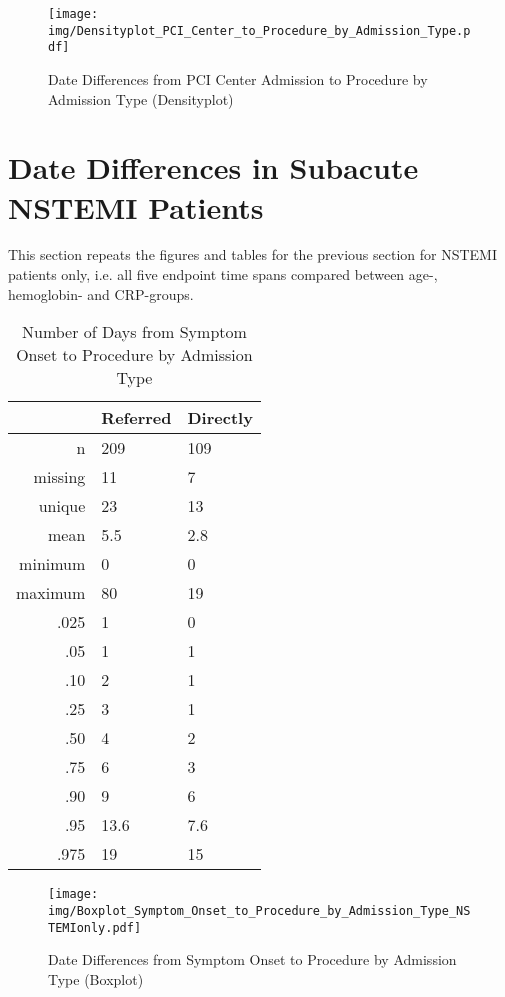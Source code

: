 \documentclass[presentation,xcolor=pdftex,dvipsnames,table,11pt]{beamer}
\begin{document}
\begin{tiny}
\begin{frame}
\begin{figure}
  \centering
  \caption{Date Differences from PCI Center Admission to Procedure by Admission Type (Densityplot)}
  \label{Density: Date Differences from PCI Center Admission to Procedure by Admission Type}
\texttt{[image: img/Densityplot\_PCI\_Center\_to\_Procedure\_by\_Admission\_Type.pdf]}\end{figure}
\end{frame}







\section{Date Differences in Subacute NSTEMI Patients}

This section repeats the figures and tables for the previous section for NSTEMI patients only, i.e. all five endpoint time spans compared between age-, hemoglobin- and CRP-groups.

\begin{table}[ht]
\centering
\begin{tabular}{rll}
  \toprule
 & Referred & Directly \\ 
  \midrule
n & 209 & 109 \\ 
  missing & 11 & 7 \\ 
  unique & 23 & 13 \\ 
  mean & 5.5 & 2.8 \\ 
  minimum & 0 & 0 \\ 
  maximum & 80 & 19 \\ 
  .025 & 1 & 0 \\ 
  .05 & 1 & 1 \\ 
  .10 & 2 & 1 \\ 
  .25 & 3 & 1 \\ 
  .50 & 4 & 2 \\ 
  .75 & 6 & 3 \\ 
  .90 & 9 & 6 \\ 
  .95 & 13.6 & 7.6 \\ 
  .975 & 19 & 15 \\ 
   \bottomrule
\end{tabular}
\caption{Number of Days from Symptom Onset to Procedure by Admission Type} 
\end{table}
\begin{frame}
\begin{figure}
  \centering
  \caption{Date Differences from Symptom Onset to Procedure by Admission Type (Boxplot)}
  \label{Boxplot: Date Differences from Symptom Onset to Procedure by Admission Type}
\texttt{[image: img/Boxplot\_Symptom\_Onset\_to\_Procedure\_by\_Admission\_Type\_NSTEMIonly.pdf]}\end{figure}
\end{frame}



\end{tiny}
\end{document}
